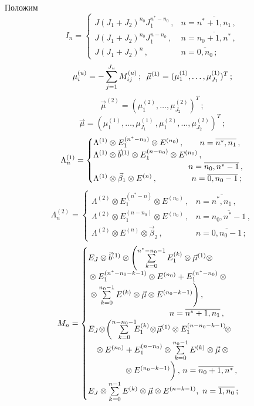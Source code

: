 \begin{multicols}{2}
Положим
$$
I_n
=
\begin{cases}
J (J_1+J_2)^{n_0} J_1^{n^*-n_0}\,,
                          &n=\overline{n^*+1,n_1}\,,        \\
J (J_1+J_2)^{n_0} J_1^{n-n_0}\,, &n=\overline{n_0+1,n^*}\,,        \\
J (J_1+J_2)^n\,,            &n=\overline{0,n_0}\,;
\end{cases}
$$
$$
\mu_i^{(u)} = - \sum\limits_{j=1}^{J_u} M^{(u)}_{ij}\,;\enskip 
\vec\mu^{(1)} = (\mu_1^{(1)},\ldots,\mu_{J_1}^{(1)})^T\,;
$$
$$
\vec\mu^{(2)} = (\mu_1^{(2)},\ldots,\mu_{J_2}^{(2)})^T\,;
$$
$$
\vec\mu = (\mu_1^{(1)},\ldots,\mu_{J_1}^{(1)}\,,
\mu_1^{(2)},\ldots,\mu_{J_2}^{(2)})^T\,;
$$
$$
\Lambda^{(1)}_n
= \begin{cases}
\Lambda^{(1)} \otimes E_1^{(n^*-n_0)} \otimes E^{(n_0)}\,, &\hspace*{-12pt}n=\overline{n^*,n_1}\,, \\
\Lambda^{(1)} \otimes \vec b^{(1)} \otimes E_1^{(n-n_0)} \otimes E^{(n_0)}\,, &\\
&\hspace*{-26pt}n=\overline{n_0,n^*-1}\,, \\
\Lambda^{(1)} \otimes \vec\beta_1 \otimes E^{(n)}\,, &\hspace*{-22pt}n=\overline{0,n_0-1}\,; 
\end{cases}
$$
$$
\Lambda^{(2)}_n = 
\begin{cases}
\Lambda^{(2)}\otimes E_1^{(n^*-n)} \otimes E^{(n_0)}\,,
 &n=\overline{n^*,n_1}\,, \\
\Lambda^{(2)} \otimes E_1^{(n-n_0)} \otimes E^{(n_0)}\,,
&n=\overline{n_0,n^*-1}\,, \\
\Lambda^{(2)} \otimes E^{(n)} \otimes \vec\beta_2\,, &n=\overline{0,n_0-1}\,; 
\end{cases}
$$
$$
M_n = \begin{cases}
E_J \otimes \vec b^{(1)} \otimes
\left(
\sum\limits_{k=0}^{n^*-n_0-1}
E_1^{(k)} \otimes
\vec\mu^{(1)} \otimes\right.{}\\
{}\otimes
E_1^{(n^*-n_0-k-1)} \otimes E^{(n_0)}
+
E_1^{(n^*-n_0)} \otimes{}\\
\left.{}\otimes
\sum\limits_{k=0}^{n_0-1}
E^{(k)} \otimes
\vec\mu \otimes E^{(n_0-k-1)}
\vphantom{\sum\limits_{k=0}^{n^*-n_0-1}}
\right),\\
\hspace*{35mm}n=\overline{n^*+1,n_1}\,, \\
E_J\! \otimes
\!\left(
\sum\limits_{k=0}^{n-n_0-1}\!\!\!
E_1^{(k)} \!\otimes\!
\vec\mu^{(1)} \otimes
E_1^{(n-n_0-k-1)}\! \otimes\right.\\
\hspace*{3mm}{}\otimes E^{(n_0)}+  
E_1^{(n-n_0)} \otimes
\sum\limits_{k=0}^{n_0-1}
E^{(k)} \otimes
\vec\mu \otimes{}\\
\hspace*{15mm}\left.{}\otimes E^{(n_0-k-1)}
\vphantom{\sum\limits_{k=0}^{n_0-1}}\right),\, 
          n=\overline{n_0+1,n^*}\,, \\
E_J \otimes
\sum\limits_{k=0}^{n-1}
E^{(k)} \otimes
\vec\mu \otimes E^{(n-k-1)},\
                    n=\overline{1,n_0}\,; 
\end{cases}
$$


\end{multicols}
